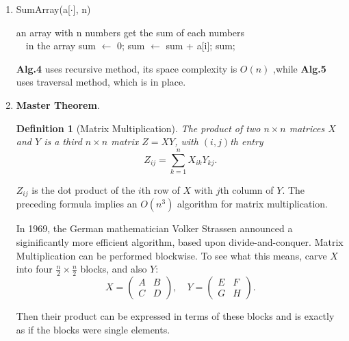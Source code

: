 \documentclass[12pt,a4paper]{article}
\makeatletter
\newtheorem*{solution}{Solution}
\newtheorem{definition}{Definition}
\theoremstyle{definition}
\renewenvironment{solution}[1][Solution] {\par\pushQED{\qed}\normalfont\topsep6\p@\@plus6\p@\relax\trivlist\item[\hskip\labelsep\bfseries#1\@addpunct{.}]\ignorespaces}{\popQED\endtrivlist\@endpefalse} \makeatother
\makeatother
\begin{document}
\begin{enumerate}
\begin{solution}
\begin{minipage}[t]{0.45\textwidth}
\end{minipage}
\begin{minipage}[t]{0.45\textwidth}
	\begin{algorithm}[H]
	\caption{SumArray(a[$\cdot$], n)}
	\label{alg:4}
	\begin{algorithmic}
		\REQUIRE an array with n numbers
		\ENSURE get the sum of each numbers \\ \qquad \quad \, \,  in the array
		\BlankLine	
		\STATE sum $\leftarrow$ 0;
		\STATE sum $\leftarrow$ sum + a[i];
		\ENDFOR
		\RETURN sum;
	\end{algorithmic}
\end{algorithm}
\end{minipage}

\textbf{Alg.4} uses recursive method, its space complexity is $O(n)$ ,while \textbf{Alg.5} uses traversal method, which is in place.

\end{solution}


\newpage

\item  \textbf{Master Theorem}.

\begin{definition}[Matrix Multiplication]
	The product of two $n \times n$ matrices $X$ and $Y$ is a third $n \times n$ matrix $Z = XY$, with $(i,j)$th entry
	$$Z_{ij}=\sum_{k=1}^{n}X_{ik}Y_{kj}.$$
\end{definition}
$Z_{ij}$ is the dot product of the $i$th row of $X$ with $j$th column of $Y$. The preceding formula implies an $O(n^3)$ algorithm for matrix multiplication.


In 1969, the German mathematician Volker Strassen announced a siginificantly more efficient algorithm, based upon divide-and-conquer. Matrix Multiplication can be performed blockwise. To see what this means, carve $X$ into four $\frac{n}{2} \times \frac{n}{2}$ blocks, and also $Y$:
\begin{displaymath}
X=
\left(\begin{array}{c|c}
A & B \\
\hline
C & D \end{array}\right), \quad
Y=\left(\begin{array}{c|c}
E & F \\
\hline
G & H \end{array}\right).
 \end{displaymath}

Then their product can be expressed in terms of these blocks and is exactly as if the blocks were single elements.


\end{enumerate}
\end{document}
